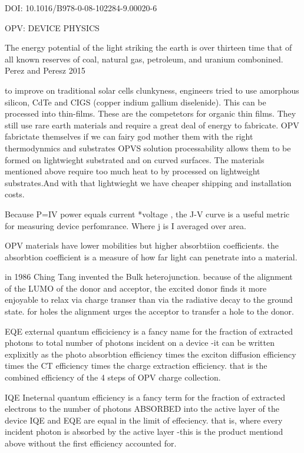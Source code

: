 	

DOI: 10.1016/B978-0-08-102284-9.00020-6

	OPV: DEVICE PHYSICS

	
    The energy potential of the light striking the earth is over thirteen time that of all known reserves of
    coal, natural gas, petroleum, and uranium combonined. Perez and Peresz 2015

    to improve on traditional solar cells clunkyness, engineers tried to use amorphous silicon, CdTe and CIGS
	(copper indium gallium diselenide). This can be processed into thin-films. These are the 
	competetors for organic thin films. They still use rare earth materials and require
	a great deal of energy to fabricate. OPV fabrictate themselves if we can fairy god mother
	them with the right thermodynmics and substrates 
	OPVS solution processability allows them to be formed on lightwieght substrated and on
	curved surfaces. The materials mentioned above require too much heat to by processed on
	lightweight substrates.And with that lightwieght we have cheaper shipping and
	installation costs.

    Because P=IV power equals current *voltage , the J-V curve is a useful metric for measuring 
	device perfomrance. Where j is I averaged over area. 

    OPV materials have lower mobilities but higher absorbtiion coefficients. the absorbtion coefficient
	is a measure of how far light can penetrate into a material. 

   in 1986 Ching Tang invented the Bulk heterojunction. because of the alignment of the LUMO of the
	donor and acceptor, the excited donor finds it more enjoyable to relax via charge transer than 
	via the radiative decay to the  ground state. for holes the alignment urges the acceptor to
	transfer a hole to the donor.

   EQE external quantum efficiciency is a fancy name for the fraction of extracted photons
	to total number of photons incident on a device
		-it can be written explixitly as the photo absorbtion efficiency times
		the exciton diffusion efficiency times the CT efficiency times the 
		charge extraction efficiency. that is the combined efficiency of
		the 4 steps of OPV charge collection. 

   IQE Ineternal quantum efficiency is a fancy term for the fraction of extracted electrons
	to the number of photons ABSORBED into the active layer of the device IQE and
	EQE are equal in the limit of effeciency. that is, where every incident photon is 
	absorbed by the active layer 
		-this is the product mentiond above without the first efficiency accounted for. 

